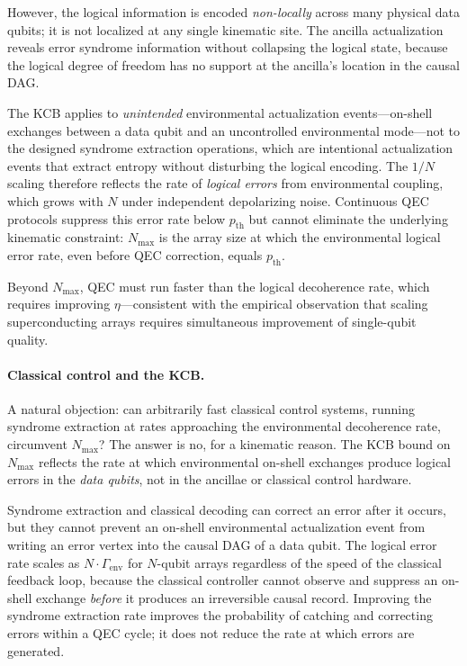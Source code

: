 \documentclass[11pt,a4paper]{article}
\theoremstyle{plain}
\theoremstyle{definition}
\theoremstyle{remark}
\begin{document}
However, the logical information
is encoded \emph{non-locally} across many physical data qubits; it is not localized
at any single kinematic site. The ancilla actualization reveals error syndrome
information without collapsing the logical state, because the logical degree of
freedom has no support at the ancilla's location in the causal DAG.

The KCB applies to \emph{unintended} environmental actualization events---on-shell
exchanges between a data qubit and an uncontrolled environmental mode---not to the
designed syndrome extraction operations, which are intentional actualization events
that extract entropy without disturbing the logical encoding. The $1/N$ scaling
therefore reflects the rate of \emph{logical errors} from environmental coupling,
which grows with $N$ under independent depolarizing noise. Continuous QEC protocols
suppress this error rate below $p_{{\mathrm{th}}}$ but cannot eliminate the
underlying kinematic constraint: $N_{{\max}}$ is the array size at which the
environmental logical error rate, even before QEC correction, equals $p_{{\mathrm{th}}}$.

Beyond $N_{{\max}}$, QEC must run faster than the logical decoherence rate, which
requires improving $\eta$---consistent with the empirical observation that scaling
superconducting arrays requires simultaneous improvement of single-qubit quality.

\paragraph{Classical control and the KCB.}
A natural objection: can arbitrarily fast classical control systems, running syndrome
extraction at rates approaching the environmental decoherence rate, circumvent
$N_{\max}$? The answer is no, for a kinematic reason. The KCB bound on $N_{\max}$
reflects the rate at which environmental on-shell exchanges produce logical errors
in the \emph{data qubits}, not in the ancillae or classical control hardware.

Syndrome extraction and classical decoding can correct an error after it occurs,
but they cannot prevent an on-shell environmental actualization event from
writing an error vertex into the causal DAG of a data qubit. The logical error
rate scales as $N \cdot \Gamma_{\mathrm{env}}$ for $N$-qubit arrays regardless of
the speed of the classical feedback loop, because the classical controller cannot
observe and suppress an on-shell exchange \emph{before} it produces an
irreversible causal record. Improving the syndrome extraction rate improves the
probability of catching and correcting errors within a QEC cycle; it does not
reduce the rate at which errors are generated.
\end{document}
